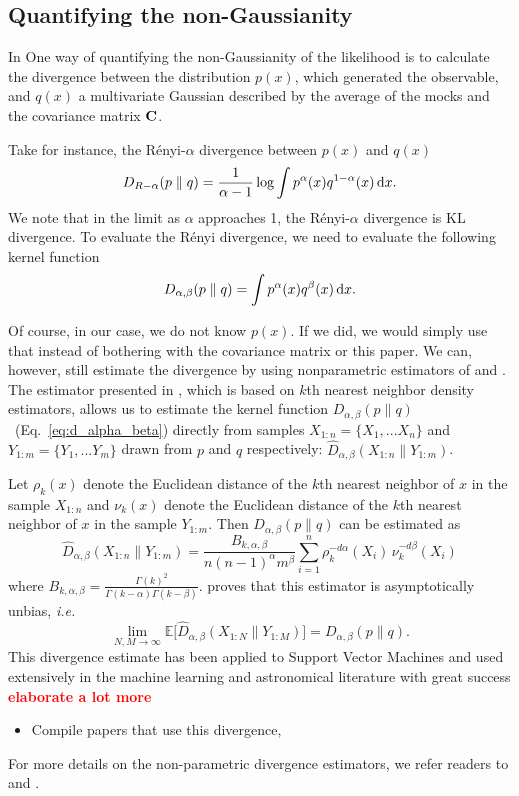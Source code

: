 \documentclass[12pt, letterpaper, preprint]{aastex}
\newcommand{\bitem}{\begin{itemize}}
\newcommand{\eitem}{\end{itemize}}
\newcommand{\beq}{\begin{equation}}
\newcommand{\eeq}{\end{equation}}
\newcommand{\todo}[1]{{\bf \textcolor{red}{#1}}}
\begin{document}
\subsection{Quantifying the non-Gaussianity}
In \cite{sellentin2017}
One way of quantifying the non-Gaussianity of the likelihood is to 
calculate the divergence between the distribution $p(x)$, which generated
the observable, and $q(x)$ a multivariate Gaussian described by the average
of the mocks and the covariance matrix ${\bf C}$.

Take for instance, the R\'enyi-$\alpha$ divergence between $p(x)$ and $q(x)$ 
\beq
D_{R-\alpha} ( p \parallel q ) = \frac{1}{\alpha -1} \log \int p^\alpha(x) q^{1 -\alpha}(x)\,{\rm d}x. 
\eeq
We note that in the limit as $\alpha$ approaches 1, the R\'enyi-$\alpha$ 
divergence is KL divergence.
To evaluate the R\'enyi divergence, we need to evaluate the following
kernel function
\beq \label{eq:d_alpha_beta}
D_{\alpha, \beta} ( p \parallel q ) = \int p^\alpha(x) q^\beta(x)\,{\rm d}x. 
\eeq

Of course, in our case, we do not know $p(x)$. If we did, we would simply 
use that instead of bothering with the covariance matrix or this paper. We can,
however, still estimate the divergence by using nonparametric estimators of 
\cite{poczos2012} and \cite{krishnamurthy2014}. The estimator presented in 
\cite{poczos2012}, which is based on $k$th nearest neighbor density estimators, 
allows us to estimate the kernel function $D_{\alpha, \beta}(p \parallel q)$~(Eq.~\ref{eq:d_alpha_beta}) 
directly from samples $X_{1:n} = \{ X_1, ... X_n \}$ and $Y_{1:m} = \{ Y_1, ... Y_m \}$ 
drawn from $p$ and $q$ respectively: $\hat{D}_{\alpha, \beta}(X_{1:n} \parallel Y_{1:m})$. 

Let $\rho_k(x)$ denote the Euclidean distance of the $k$th nearest neighbor 
of $x$ in the sample $X_{1:n}$ and $\nu_k(x)$ denote the Euclidean distance 
of the $k$th nearest neighbor of $x$ in the sample $Y_{1:m}$. Then 
$D_{\alpha, \beta}(p \parallel q)$ can be estimated as 
\beq
\hat{D}_{\alpha, \beta}(X_{1:n} \parallel Y_{1:m}) = \frac{B_{k,\alpha,\beta}}{n (n-1)^\alpha m^\beta} \sum\limits_{i=1}^{n} \rho_k^{-d \alpha}(X_i)\,\nu_k^{-d \beta}(X_i)
\eeq
where $B_{k, \alpha, \beta} = \frac{\Gamma(k)^2}{\Gamma(k-\alpha)\Gamma(k-\beta)}$. 
\cite{poczos2012} proves that this estimator is asymptotically unbias, \emph{i.e.} 
\beq
\lim_{N, M \rightarrow \infty} \mathbb{E} \big[ \hat{D}_{\alpha, \beta} (X_{1:N} \parallel Y_{1:M}) \big] = D_{\alpha, \beta} (p \parallel q). 
\eeq
This divergence estimate has been applied to Support Vector Machines and used 
extensively in the machine learning and astronomical literature with great success 
\todo{elaborate a lot more} 
\bitem 
    \item Compile papers that use this divergence, \cite{ntampaka2015, ntampaka2016}
\eitem
For more details on the non-parametric divergence estimators, we refer readers to 
\cite{poczos2012} and \cite{krishnamurthy2014}.
\end{document}
